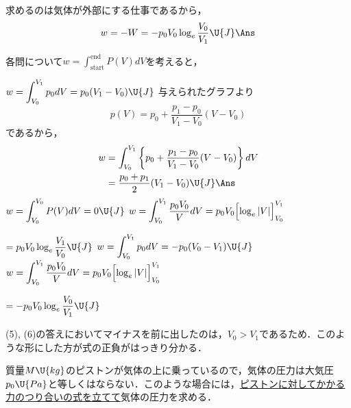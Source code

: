 \begin{multicols}{2}
\begin{komon}
       求めるのは気体が外部にする仕事であるから，
       \[w=-W=-p_0V_0\log_e\frac{V_0}{V_1}\U{J}\Ans\]
\end{komon}
\begin{bekkai}
各問について$w=\displaystyle\int_{\mathrm{start}}^{\mathrm{end}}P(V)dV$を考えると，
\begin{komon}
 $w=\displaystyle\int_{V_0}^{V_1}p_0dV=p_0(V_1-V_0)\U{J}$\Ans
{} 与えられたグラフより
       \[p(V)=p_0+\frac{p_1-p_0}{V_1-V_0}(V-V_0)\]
       であるから，
       \[\begin{aligned}
         w&=\int_{V_0}^{V_1}\left\{p_0+\frac{p_1-p_0}{V_1-V_0}(V-V_0)\right\}dV\\
          &=\frac{p_0+p_1}{2}(V_1-V_0)\U{J}\Ans
       \end{aligned}\]
 $w=\displaystyle\int_{V_0}^{V_0}P(V)dV=0\U{J}$\Ans
{} $w=\displaystyle\int_{V_0}^{V_1}\frac{p_0V_0}{V}dV=p_0V_0\Bigl[\log_e|V|\Bigr]_{V_0}^{V_1}$\par
       \hspace*{1zw}$=p_0V_0\log_e\dfrac{V_1}{V_0}\U{J}$\Ans
{} $w=\displaystyle\int_{V_0}^{V_1}p_0dV=-p_0(V_0-V_1)\U{J}$\Ans
{} $w=\displaystyle\int_{V_0}^{V_1}\frac{p_0V_0}{V}dV=p_0V_0\Bigl[\log_e|V|\Bigr]_{V_0}^{V_1}$\par
       \hspace*{1zw}$=-p_0V_0\log_e\dfrac{V_0}{V_1}\U{J}$\Ans
\end{komon}
\end{bekkai}
\begin{chuu}
(5), (6)の答えにおいてマイナスを前に出したのは，$V_0>V_1$であるため．このような形にした方が式の正負がはっきり分かる．
\end{chuu}

\par\nopagebreak
\begin{sisin}
質量$M\U{kg}$のピストンが気体の上に乗っているので，気体の圧力は大気圧$p_0\U{Pa}$と等しくはならない．このような場合には，\underline{ピストン}\hskip0pt\underline{に対して}\hskip0pt\underline{かかる力}\hskip0pt\underline{のつり合}\hskip0pt\underline{いの式を}\hskip0pt\underline{立てて}気体の圧力を求める．


\end{sisin}
\end{multicols}
